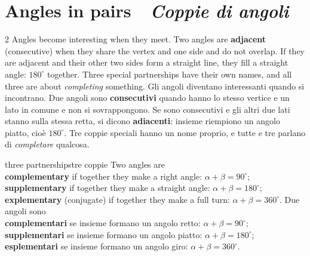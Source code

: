 \documentclass[10pt,a4paper,oneside]{book}
\newif\ifIT
\newenvironment{bi}%
  {\begin{paracol}{2}\global\ITfalse\selectlanguage{english}}%
  {\end{paracol}}
\newcommand{\IT}{\switchcolumn\global\ITtrue\selectlanguage{italian}}
\newcommand{\bisection}[2]{%
  \Needspace{7\baselineskip}%
  \section[#1 \textperiodcentered\ #2]{#1 {\color{itgreen}\itshape\,\textperiodcentered\ #2}}}
\begin{document}
\bisection{Angles in pairs}{Coppie di angoli}\label{sec:pairs}
\begin{bi}
Angles become interesting when they meet. Two angles are \textbf{adjacent} (consecutive) when they share the vertex and one side and do not overlap. If they are adjacent and their other two sides form a straight line, they fill a straight angle: $180^\circ$ together. Three special partnerships have their own names, and all three are about \emph{completing} something.
\IT
Gli angoli diventano interessanti quando si incontrano. Due angoli sono \textbf{consecutivi} quando hanno lo stesso vertice e un lato in comune e non si sovrappongono. Se sono consecutivi e gli altri due lati stanno sulla stessa retta, si dicono \textbf{adiacenti}: insieme riempiono un angolo piatto, cioè $180^\circ$. Tre coppie speciali hanno un nome proprio, e tutte e tre parlano di \emph{completare} qualcosa.
\end{bi}

\begin{defn}{three partnerships}{tre coppie}
Two angles are\\
\textbf{complementary} if together they make a right angle: $\alpha + \beta = 90^\circ$;\\
\textbf{supplementary} if together they make a straight angle: $\alpha + \beta = 180^\circ$;\\
\textbf{explementary} (conjugate) if together they make a full turn: $\alpha + \beta = 360^\circ$.
\tcblower
Due angoli sono\\
\textbf{complementari} se insieme formano un angolo retto: $\alpha + \beta = 90^\circ$;\\
\textbf{supplementari} se insieme formano un angolo piatto: $\alpha + \beta = 180^\circ$;\\
\textbf{esplementari} se insieme formano un angolo giro: $\alpha + \beta = 360^\circ$.
\end{defn}
\end{document}
